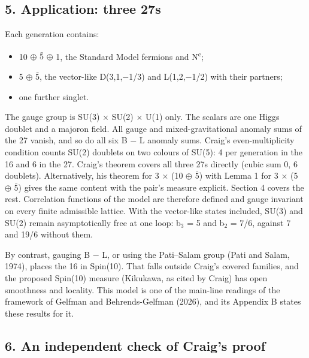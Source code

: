 \documentclass[
]{article}
\providecommand{\tightlist}{%
  \setlength{\itemsep}{0pt}\setlength{\parskip}{0pt}}
\begin{document}
\hypertarget{application-three-27s}{%
\subsection{5. Application: three 27s}\label{application-three-27s}}

Each generation contains:

\begin{itemize}
\tightlist
\item
  10 \ensuremath{\oplus} \ensuremath{\bar{5}} \ensuremath{\oplus} 1, the Standard Model fermions and N\textsuperscript{c};
\item
  5 \ensuremath{\oplus} \ensuremath{\bar{5}}, the vector-like D(3,1,\ensuremath{-}1/3) and L(1,2,\ensuremath{-}1/2) with their
  partners;
\item
  one further singlet.
\end{itemize}

The gauge group is SU(3) \ensuremath{\times} SU(2) \ensuremath{\times} U(1) only. The scalars are one Higgs
doublet and a majoron field. All gauge and mixed-gravitational anomaly
sums of the 27 vanish, and so do all six B \ensuremath{-} L anomaly sums. Craig's
even-multiplicity condition counts SU(2) doublets on two colours of
SU(5): 4 per generation in the 16 and 6 in the 27. Craig's theorem
covers all three 27s directly (cubic sum 0, 6 doublets). Alternatively,
his theorem for 3 \ensuremath{\times} (10 \ensuremath{\oplus} \ensuremath{\bar{5}}) with Lemma 1 for 3 \ensuremath{\times} (5 \ensuremath{\oplus} \ensuremath{\bar{5}}) gives the same
content with the pair's measure explicit. Section 4 covers the rest.
Correlation functions of the model are therefore defined and gauge
invariant on every finite admissible lattice. With the vector-like
states included, SU(3) and SU(2) remain asymptotically free at one loop:
b\ensuremath{_{3}} = 5 and b\ensuremath{_{2}} = 7/6, against 7 and 19/6 without them.

By contrast, gauging B \ensuremath{-} L, or using the Pati--Salam group (Pati and
Salam, 1974), places the 16 in Spin(10). That falls outside Craig's
covered families, and the proposed Spin(10) measure (Kikukawa, as cited
by Craig) has open smoothness and locality. This model is one of the
main-line readings of the framework of Gelfman and Behrends-Gelfman
(2026), and its Appendix B states these results for it.

\hypertarget{an-independent-check-of-craigs-proof}{%
\subsection{6. An independent check of Craig's
proof}\label{an-independent-check-of-craigs-proof}}
\end{document}
